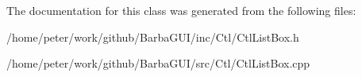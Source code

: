 The documentation for this class was generated from the following files\+:\begin{DoxyCompactItemize}
\item 
/home/peter/work/github/\+Barba\+G\+U\+I/inc/\+Ctl/Ctl\+List\+Box.\+h\item 
/home/peter/work/github/\+Barba\+G\+U\+I/src/\+Ctl/Ctl\+List\+Box.\+cpp\end{DoxyCompactItemize}
